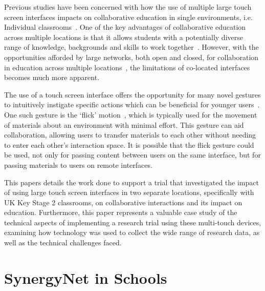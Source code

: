 \documentclass[a4paper,11pt]{article}
\begin{document}
Previous studies have been concerned with how the use of multiple large touch screen interfaces impacts on collaborative education in single environments, i.e. Individual classrooms~\cite{mohammed:2012,kreitmayer:2013,mercier:2015}.
One of the key advantages of collaborative education across multiple locations is that it allows students with a potentially diverse range of knowledge, backgrounds and skills to work together~\cite{kizilcec:2013}.
However, with the opportunities afforded by large networks, both open and closed, for collaboration in education across multiple locations~\cite{daradoumis:2000,mcconnell:2012}, the limitations of co-located interfaces becomes much more apparent.

The use of a touch screen interface offers the opportunity for many novel gestures to intuitively instigate specific actions which can be beneficial for younger users~\cite{kim:2007,wu:2003,rick:2009}.
One such gesture is the `flick' motion~\cite{reetz-et-al:2006}, which is typically used for the movement of materials about an environment with minimal effort.
This gesture can aid collaboration, allowing users to transfer materials to each other without needing to enter each other's interaction space.
 It is possible that the flick gesture could be used, not only for passing content between users on the same interface, but for passing materials to users on remote interfaces.

This papers details the work done to support a trial that investigated the impact of using large touch screen interfaces in two separate locations, specifically with UK Key Stage 2 classrooms, on collaborative interactions and its impact on education. 
Furthermore, this paper represents a valuable case study of the technical aspects of implementing a research trial using these multi-touch devices, examining how technology was used to collect the wide range of research data, as well as the technical challenges faced.


\section{SynergyNet in Schools}
\end{document}
